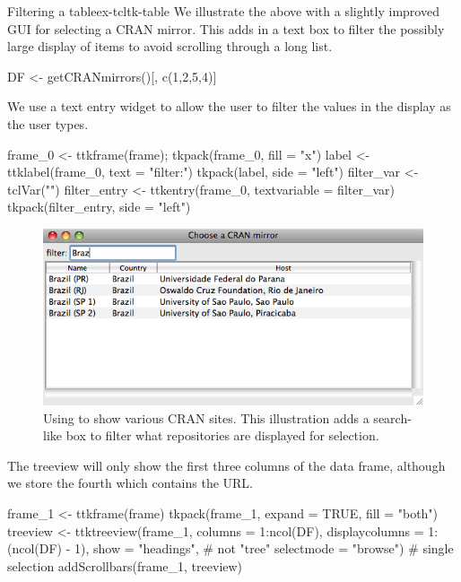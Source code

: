 \begin{example}{Filtering a table}{ex-tcltk-table}
%
We illustrate the above with a slightly improved GUI for selecting a CRAN mirror. This adds in a text box to filter the possibly large display of items to avoid scrolling through a long list. 
\begin{Schunk}
\begin{Sinput}
 DF <- getCRANmirrors()[, c(1,2,5,4)]
\end{Sinput}
\end{Schunk}


We use a text entry widget to allow the user to filter the values in the display as the user types.
\begin{Schunk}
\begin{Sinput}
 frame_0 <- ttkframe(frame); tkpack(frame_0, fill = "x")
 label <- ttklabel(frame_0, text = "filter:")
 tkpack(label, side = "left")
 filter_var <- tclVar("")
 filter_entry <- ttkentry(frame_0, textvariable = filter_var)
 tkpack(filter_entry, side = "left")
\end{Sinput}
\end{Schunk}

\begin{figure}
  \centering
  \includegraphics[width=.8\textwidth]{fig-tcltk-filter-table.png}
  \caption{Using  to show various CRAN sites. This
    illustration adds a search-like box to filter what repositories
    are displayed for selection.}
  \label{fig:fig-tcltk-filter-table}
\end{figure}


The treeview  will only show the first three columns of the data frame, although we store the fourth which contains the URL.
\begin{Schunk}
\begin{Sinput}
 frame_1 <- ttkframe(frame)
 tkpack(frame_1, expand = TRUE, fill = "both")
 treeview <- ttktreeview(frame_1, columns = 1:ncol(DF), 
                   displaycolumns = 1:(ncol(DF) - 1), 
                   show = "headings",     # not "tree" 
                   selectmode = "browse") # single selection
 addScrollbars(frame_1, treeview)
\end{Sinput}
\end{Schunk}


\end{example}
